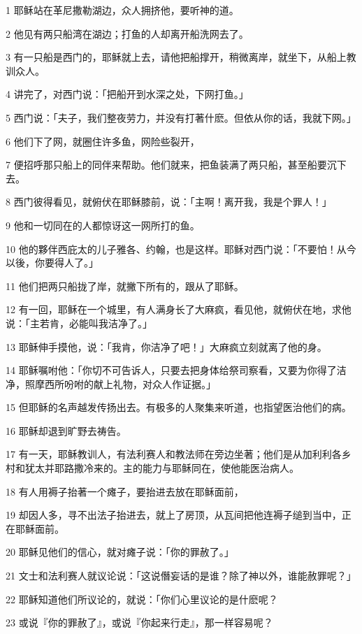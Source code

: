 \par 1 耶稣站在革尼撒勒湖边，众人拥挤他，要听神的道。
\par 2 他见有两只船湾在湖边；打鱼的人却离开船洗网去了。
\par 3 有一只船是西门的，耶稣就上去，请他把船撑开，稍微离岸，就坐下，从船上教训众人。
\par 4 讲完了，对西门说：「把船开到水深之处，下网打鱼。」
\par 5 西门说：「夫子，我们整夜劳力，并没有打著什麽。但依从你的话，我就下网。」
\par 6 他们下了网，就圈住许多鱼，网险些裂开，
\par 7 便招呼那只船上的同伴来帮助。他们就来，把鱼装满了两只船，甚至船要沉下去。
\par 8 西门彼得看见，就俯伏在耶稣膝前，说：「主啊！离开我，我是个罪人！」
\par 9 他和一切同在的人都惊讶这一网所打的鱼。
\par 10 他的夥伴西庇太的儿子雅各、约翰，也是这样。耶稣对西门说：「不要怕！从今以後，你要得人了。」
\par 11 他们把两只船拢了岸，就撇下所有的，跟从了耶稣。
\par 12 有一回，耶稣在一个城里，有人满身长了大麻疯，看见他，就俯伏在地，求他说：「主若肯，必能叫我洁净了。」
\par 13 耶稣伸手摸他，说：「我肯，你洁净了吧！」大麻疯立刻就离了他的身。
\par 14 耶稣嘱咐他：「你切不可告诉人，只要去把身体给祭司察看，又要为你得了洁净，照摩西所吩咐的献上礼物，对众人作证据。」
\par 15 但耶稣的名声越发传扬出去。有极多的人聚集来听道，也指望医治他们的病。
\par 16 耶稣却退到旷野去祷告。
\par 17 有一天，耶稣教训人，有法利赛人和教法师在旁边坐著；他们是从加利利各乡村和犹太并耶路撒冷来的。主的能力与耶稣同在，使他能医治病人。
\par 18 有人用褥子抬著一个瘫子，要抬进去放在耶稣面前，
\par 19 却因人多，寻不出法子抬进去，就上了房顶，从瓦间把他连褥子缒到当中，正在耶稣面前。
\par 20 耶稣见他们的信心，就对瘫子说：「你的罪赦了。」
\par 21 文士和法利赛人就议论说：「这说僭妄话的是谁？除了神以外，谁能赦罪呢？」
\par 22 耶稣知道他们所议论的，就说：「你们心里议论的是什麽呢？
\par 23 或说『你的罪赦了』，或说『你起来行走』，那一样容易呢？
